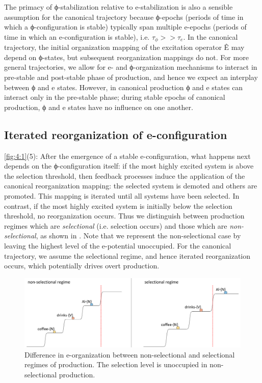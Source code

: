   The primacy of ϕ-stabilization relative to e-stabilization is also a sensible assumption for the canonical trajectory because ϕ-epochs (periods of time in which a ϕ-configuration is stable) typically span multiple e-epochs (periods of time in which an e-configuration is stable), i.e. $\tau_{\phi} >> \tau_e$. In the canonical trajectory, the initial organization mapping of the excitation operator Ê may depend on ϕ-states, but subsequent reorganization mappings do not. For more general trajectories, we allow for e- and ϕ-organization mechanisms to interact in pre-stable and post-stable phase of production, and hence we expect an interplay between ϕ and e states. However, in canonical production ϕ and e states can interact only in the pre-stable phase; during stable epochs of canonical production, ϕ and e states have no influence on one another. 

\subsection{Iterated reorganization of e-configuration}

\ref{fig:4:1}(5): After the emergence of a stable e-configuration, what happens next depends on the ϕ-configuration itself: if the most highly excited system is above the selection threshold, then feedback processes induce the application of the canonical reorganization mapping: the selected system is demoted and others are promoted. This mapping is iterated until all systems have been selected. In contrast, if the most highly excited system is initially below the selection threshold, no reorganization occurs. Thus we distinguish between production regimes which are \textit{selectional} (i.e. selection occurs) and those which are \textit{non-selectional}, as shown in {}. Note that we represent the non-selectional case by leaving the highest level of the e-potential unoccupied. For the canonical trajectory, we assume the selectional regime, and hence iterated reorganization occurs, which potentially drives overt production. 

  
\begin{figure}
\includegraphics[width=\textwidth]{figures/Tilsen-img53.png}
\caption{Difference in e-organization between non-selectional and selectional regimes of production. The selection level is unoccupied in non-selectional production.}
\label{fig:4:3}
\end{figure}
 


